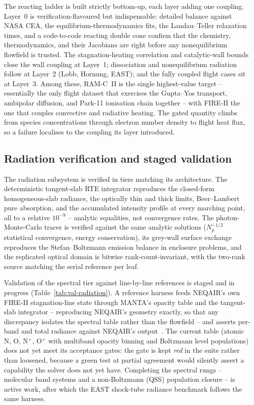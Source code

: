\documentclass[journal,biblatex]{new-aiaa}
\begin{document}
The reacting ladder is built strictly bottom-up, each layer adding one coupling. Layer~0 is verification-flavoured but indispensable: detailed balance against NASA CEA, the equilibrium-thermodynamics fits, the Landau--Teller relaxation times, and a code-to-code reacting double cone confirm that the chemistry, thermodynamics, and their Jacobians are right before any nonequilibrium flowfield is trusted. The stagnation-heating correlation and catalytic-wall bounds close the wall coupling at Layer~1; dissociation and nonequilibrium radiation follow at Layer~2 (Lobb, Hornung, EAST); and the fully coupled flight cases sit at Layer~3. Among these, RAM-C~II is the single highest-value target -- essentially the only flight dataset that exercises the Gupta--Yos transport, ambipolar diffusion, and Park-11 ionisation chain together -- with FIRE-II the one that couples convective and radiative heating. The gated quantity climbs from species concentrations through electron number density to flight heat flux, so a failure localises to the coupling its layer introduced.

\subsection{Radiation verification and staged validation}
\label{sec:vv-rad}

The radiation subsystem is verified in tiers matching its architecture. The deterministic tangent-slab RTE integrator reproduces the closed-form homogeneous-slab radiance, the optically thin and thick limits, Beer--Lambert pure absorption, and the accumulated intensity profile at every marching point, all to a relative $10^{-9}$ -- analytic equalities, not convergence rates. The photon-Monte-Carlo tracer is verified against the same analytic solutions ($N_p^{-1/2}$ statistical convergence, energy conservation), its grey-wall surface exchange reproduces the Stefan--Boltzmann emission balance in enclosure problems, and the replicated optical domain is bitwise rank-count-invariant, with the two-rank source matching the serial reference per leaf.

Validation of the spectral tier against line-by-line references is staged and in progress (Table~\ref{tab:val-radiation}). A reference harness feeds NEQAIR's own FIRE-II stagnation-line state through MANTA's opacity table and the tangent-slab integrator -- reproducing NEQAIR's geometry exactly, so that any discrepancy isolates the spectral table rather than the flowfield -- and asserts per-band and total radiance against NEQAIR's output~\cite{johnston_nonequilibrium_2008,cruden_measurement_2020}. The current table (atomic N, O, N$^+$, O$^+$ with multiband opacity binning and Boltzmann level populations) does not yet meet its acceptance gates: the gate is kept \emph{red} in the suite rather than loosened, because a green test at partial agreement would silently assert a capability the solver does not yet have. Completing the spectral rungs -- molecular band systems and a non-Boltzmann (QSS) population closure -- is active work, after which the EAST shock-tube radiance benchmark follows the same harness.
\end{document}
